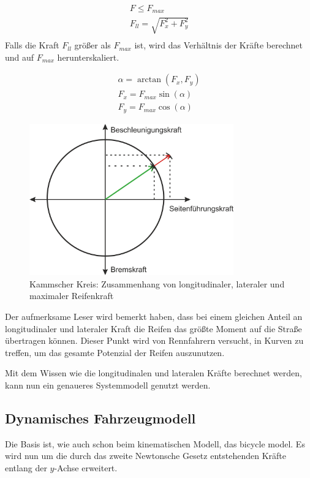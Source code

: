 \documentclass{like}
\begin{document}
\begin{eqnarray}
F \leq F_{max} \\
F_{ll} = \sqrt{F_x^2 + F_y^2}  \\
\end{eqnarray}
Falls die Kraft $F_{ll}$ größer als $F_{max}$ ist, wird das Verhältnis der Kräfte berechnet und auf $F_{max}$ herunterskaliert.

\begin{eqnarray}
\alpha = \arctan(F_x, F_y)\\
F_x = F_{max} \sin(\alpha)\\
F_y = F_{max} \cos(\alpha)
\end{eqnarray}

\begin{figure}[ht!]
	\centering
	\includegraphics[width=250pt]{Abbildungen/kamKreis.png}
	\caption{Kammscher Kreis: Zusammenhang von longitudinaler, lateraler und maximaler Reifenkraft}
	\label{fig:kamKreis}
\end{figure}

Der aufmerksame Leser wird bemerkt haben, dass bei einem gleichen Anteil an longitudinaler und lateraler Kraft die Reifen das größte Moment auf die Straße übertragen können. Dieser Punkt wird von Rennfahrern versucht, in Kurven zu treffen, um das gesamte Potenzial der Reifen auszunutzen.


Mit dem Wissen wie die longitudinalen und lateralen Kräfte berechnet werden, kann nun ein genaueres Systemmodell genutzt werden.

\subsection{Dynamisches Fahrzeugmodell}
\label{dynModel}

Die Basis ist, wie auch schon beim kinematischen Modell, das bicycle model. Es wird nun um die durch das zweite Newtonsche Gesetz entstehenden Kräfte entlang der \(y\)-Achse erweitert.
\end{document}
